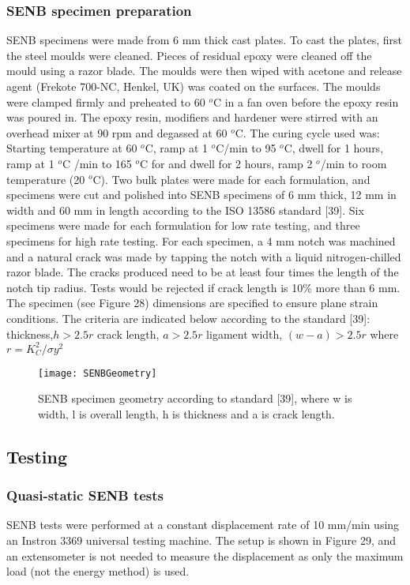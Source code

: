 \documentclass[numbers=noendperiod,chapterprefix=on]{icldt} %
\begin{document}
\subsubsection{SENB specimen preparation}
SENB specimens were made from 6 mm thick cast plates. To cast the plates, first the steel moulds were cleaned. Pieces of residual epoxy were cleaned off the mould using a razor blade. The moulds were then wiped with acetone and release agent (Frekote 700-NC, Henkel, UK) was coated on the surfaces. The moulds were clamped firmly and preheated to 60 $^o$C in a fan oven before the epoxy resin was poured in. 
The epoxy resin, modifiers and hardener were stirred with an overhead mixer at 90 rpm and degassed at 60 $^o$C. The curing cycle used was: Starting temperature at 60 $^o$C, ramp at 1 $^o$C/min to 95 $^o$C, dwell for 1 hours, ramp at 1 $^o$C /min to 165 $^o$C for and dwell for 2 hours, ramp 2 $^o$/min to room temperature (20 $^o$C).
Two bulk plates were made for each formulation, and specimens were cut and polished into SENB specimens of 6 mm thick, 12 mm in width and 60 mm in length according to the ISO 13586 standard [39]. Six specimens were made for each formulation for low rate testing, and three specimens for high rate testing. 
For each specimen, a 4 mm notch was machined and a natural crack was made by tapping the notch with a liquid nitrogen-chilled razor blade. The cracks produced need to be at least four times the length of the notch tip radius. Tests would be rejected if crack length is 10\% more than 6 mm.
The specimen (see Figure 28) dimensions are specified to ensure plane strain conditions. The criteria are indicated below according to the standard [39]:
\newline
thickness,$ h > 2.5 r$
\newline
crack length, $a > 2.5 r$
\newline
ligament width, $(w - a) > 2.5 r$
\newline
where $r = K_C^2/\sigma y^2 $

\begin{figure}[!hp]
\centering
\texttt{[image: SENBGeometry]}
\caption{SENB specimen geometry according to standard [39], where w is width, l is overall length, h is thickness and a is crack length.} %
\end{figure}
\FloatBarrier
\subsection{Testing}
\subsubsection{Quasi-static SENB tests}
SENB tests were performed at a constant displacement rate of 10 mm/min using an Instron 3369 universal testing machine. The setup is shown in Figure 29, and an extensometer is not needed to measure the displacement as only the maximum load (not the energy method) is used.
\end{document}
